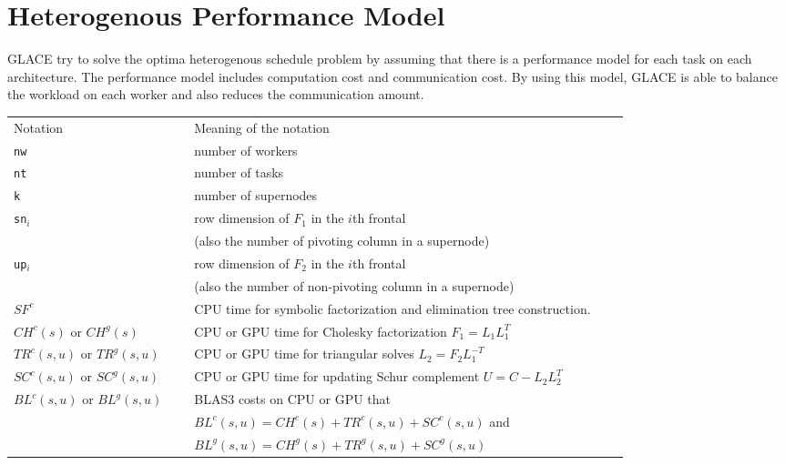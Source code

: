 \documentclass[preprint,11pt]{elsarticle}
\begin{document}
\section{Heterogenous Performance Model}
  GLACE try to solve the optima heterogenous schedule problem by assuming that there is 
  a performance model for each task on each architecture. The performance model includes
  computation cost and communication cost. By using this model, GLACE is able to balance
  the workload on each worker and also reduces the communication amount.  

\begin{table}
  \centering
  {\footnotesize 
  \begin{tabular}{lllll}
    \hline
    Notation    &\ & Meaning of the notation \\  \cline{1-1}  \cline{3-3}
    {\tt nw}        && number of workers \\
    {\tt nt}          && number of tasks \\
    {\tt k}           && number of supernodes \\
    {\tt sn$_i$}  && row dimension of $F_1$ in the $i$th frontal \\
                       && (also the number of pivoting column in a supernode) \\
    {\tt up$_i$}  && row dimension of $F_2$ in the $i$th frontal \\
                       && (also the number of non-pivoting column in a supernode) \\ 
    \hline
    $SF^c$  && CPU time for symbolic factorization and elimination tree construction.\\
    $CH^c(s)$ or $CH^g(s)$     && CPU or GPU time for Cholesky factorization $F_1=L_1L_1^{T}$ \\
    $TR^c(s,u)$ or $TR^g(s,u)$ && CPU or GPU time for triangular solves $L_2 = F_2L_1^{-T}$\\
    $SC^c(s, u)$ or $SC^g(s, u)$     && CPU or GPU time for updating Schur complement $U = C - L_2L_2^{T}$ \\
    $BL^c(s,u)$ or $BL^g(s,u)$ && BLAS3 costs on CPU or GPU that\\
    && $BL^c(s,u) = CH^c(s) + TR^c(s, u) +SC^c(s, u)$ and\\
    && $BL^g(s,u) = CH^g(s) + TR^g(s, u) +SC^g(s, u)$\\\hline


\end{tabular}}
\end{table}
\end{document}
